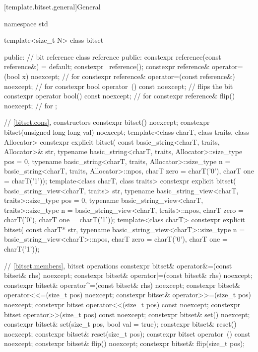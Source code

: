 [template.bitset.general]{General}%
%
\begin{codeblock}
namespace std {
  template<size_t N> class bitset {
  public:
    // bit reference
    class reference {
    public:
      constexpr reference(const reference&) = default;
      constexpr ~reference();
      constexpr reference& operator=(bool x) noexcept;              // for 
      constexpr reference& operator=(const reference&) noexcept;    // for 
      constexpr bool operator~() const noexcept;                    // flips the bit
      constexpr operator bool() const noexcept;                     // for 
      constexpr reference& flip() noexcept;                         // for 
    };

    // \ref{bitset.cons}, constructors
    constexpr bitset() noexcept;
    constexpr bitset(unsigned long long val) noexcept;
    template<class charT, class traits, class Allocator>
      constexpr explicit bitset(
        const basic_string<charT, traits, Allocator>& str,
        typename basic_string<charT, traits, Allocator>::size_type pos = 0,
        typename basic_string<charT, traits, Allocator>::size_type n
          = basic_string<charT, traits, Allocator>::npos,
        charT zero = charT('0'),
        charT one = charT('1'));
    template<class charT, class traits>
      constexpr explicit bitset(
        basic_string_view<charT, traits> str,
        typename basic_string_view<charT, traits>::size_type pos = 0,
        typename basic_string_view<charT, traits>::size_type n
          = basic_string_view<charT, traits>::npos,
        charT zero = charT('0'),
        charT one = charT('1'));
    template<class charT>
      constexpr explicit bitset(
        const charT* str,
        typename basic_string_view<charT>::size_type n = basic_string_view<charT>::npos,
        charT zero = charT('0'),
        charT one = charT('1'));

    // \ref{bitset.members}, bitset operations
    constexpr bitset& operator&=(const bitset& rhs) noexcept;
    constexpr bitset& operator|=(const bitset& rhs) noexcept;
    constexpr bitset& operator^=(const bitset& rhs) noexcept;
    constexpr bitset& operator<<=(size_t pos) noexcept;
    constexpr bitset& operator>>=(size_t pos) noexcept;
    constexpr bitset  operator<<(size_t pos) const noexcept;
    constexpr bitset  operator>>(size_t pos) const noexcept;
    constexpr bitset& set() noexcept;
    constexpr bitset& set(size_t pos, bool val = true);
    constexpr bitset& reset() noexcept;
    constexpr bitset& reset(size_t pos);
    constexpr bitset  operator~() const noexcept;
    constexpr bitset& flip() noexcept;
    constexpr bitset& flip(size_t pos);

}}
\end{codeblock}
